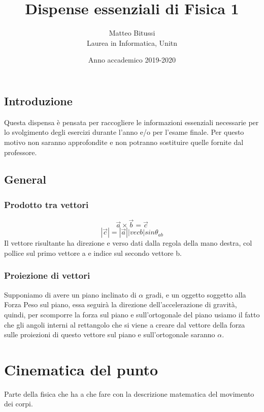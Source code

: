 \documentclass[a4paper]{report}
\title{Dispense essenziali di Fisica 1}
\author{Matteo Bitussi \\ Laurea in Informatica, Unitn}
\date{Anno accademico 2019-2020}
\begin{document}
  \maketitle

  \tableofcontents

  \section*{Introduzione}
  Questa dispensa è pensata per raccogliere le informazioni essenziali necessarie per lo svolgimento degli esercizi durante l'anno e/o per l'esame finale. Per questo motivo non saranno approfondite e non potranno sostituire quelle fornite dal professore.

  \section*{General}
  \subsection{Prodotto tra vettori}
  $$ \vec{a} \times \vec{b} = \vec{c} $$
  $$ |\vec{c}| = |\vec{a}||vec{b}| sin \theta_{ab} $$
  Il vettore risultante ha direzione e verso dati dalla regola della mano destra, col pollice sul primo vettore a e indice sul secondo vettore b.

  \subsection{Proiezione di vettori}
  Supponiamo di avere un piano inclinato di $\alpha$ gradi, e un oggetto soggetto alla Forza Peso sul piano, essa seguirà la direzione dell'accelerazione di gravità, quindi, per scomporre la forza sul piano e sull'ortogonale del piano usiamo il fatto che gli angoli interni al rettangolo che si viene a creare dal vettore della forza sulle proiezioni di questo vettore sul piano e sull'ortogonale saranno $\alpha$.

  \chapter{Cinematica del punto}
  Parte della fisica che ha a che fare con la descrizione matematica del movimento dei corpi.
\end{document}
